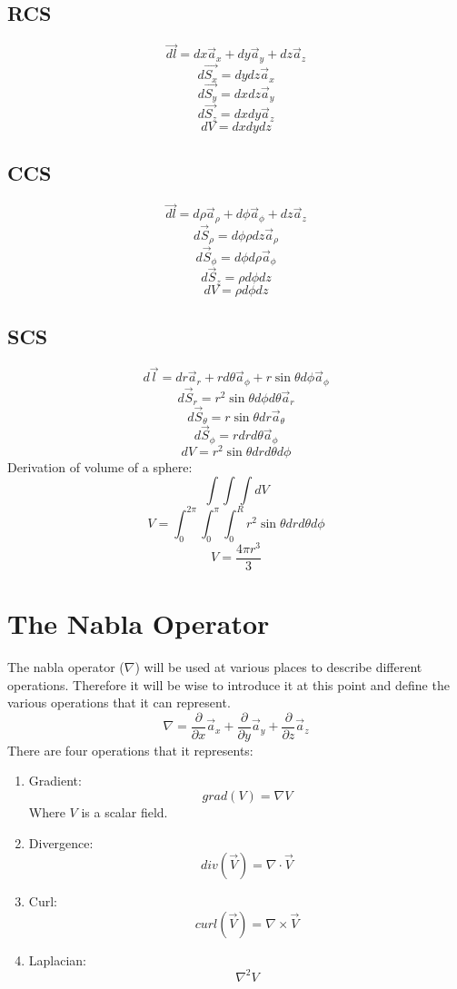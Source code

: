         \subsection{RCS}
            
            $$\vec{dl} = dx\vec{a}_x + dy\vec{a}_y + dz\vec{a}_z$$
            $$d\vec{S_x} = dydz\vec{a}_x$$
            $$d\vec{S_y} = dxdz\vec{a}_y$$
            $$d\vec{S_z} = dxdy\vec{a}_z$$
            $$dV = dxdydz$$
        \subsection{CCS}
            
            $$\vec{dl} = d\rho\vec{a}_\rho + d\phi\vec{a}_\phi + dz\vec{a}_z$$
            $$d\vec{S}_\rho = d\phi\rho dz\vec{a}_\rho$$
            $$d\vec{S}_\phi = d\phi d\rho\vec{a}_\phi$$
            $$d\vec{S}_z = \rho d\phi dz$$
            $$dV = \rho d\phi dz$$
        \subsection{SCS}
            
            $$d\vec{l}=dr\vec{a}_r + rd\theta\vec{a}_\phi + r\sin\theta d\phi\vec{a}_\phi$$
            $$d\vec{S}_r = r^2\sin\theta d\phi d\theta \vec{a}_r$$
            $$d\vec{S}_\theta = r\sin\theta dr\vec{a}_\theta$$
            $$d\vec{S}_\phi = rdrd\theta\vec{a}_\phi$$
            $$dV = r^2\sin\theta drd\theta d\phi$$
            Derivation of volume of a sphere:
            $$\int\int\int dV$$
            $$V = \int_{0}^{2\pi}\int_{0}^{\pi}\int_{0}^{R}r^2\sin\theta drd\theta d\phi$$
            $$V = \frac{4\pi{r}^3}{3}$$
    \section{The Nabla Operator}
        The nabla operator ($\nabla$) will be used at various places to describe different operations. Therefore it will be wise to introduce it at this point and define the various operations that it can represent.
        $$\nabla = \frac{\partial}{\partial x}\vec{a}_x + \frac{\partial}{\partial y}\vec{a}_y + \frac{\partial}{\partial z}\vec{a}_z$$
        There are four operations that it represents:
        \begin{enumerate}
            \item Gradient: $$grad(V) = \nabla V$$ Where $V$ is a scalar field.
            \item Divergence: $$div(\vec{V}) = \nabla \cdot \vec{V}$$
            \item Curl: $$curl(\vec{V}) = \nabla \times \vec{V}$$
            \item Laplacian: $$\nabla^2V$$
        \end{enumerate}
